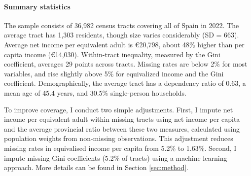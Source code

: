 \paragraph{Summary statistics} The sample consists of 36,982 census tracts covering all of Spain in 2022. The average tract has 1,303 residents, though size varies considerably (SD = 663). Average net income per equivalent adult is €20,798, about 48\% higher than per capita income (€14,030). Within-tract inequality, measured by the Gini coefficient, averages 29 points across tracts. Missing rates are below 2\% for most variables, and rise slightly above 5\% for equivalized income and the Gini coefficient. Demographically, the average tract has a dependency ratio of 0.63, a mean age of 45.4 years, and 30.5\% single-person households.

\begin{table}[H]
\centering
{}
\end{table}

To improve coverage, I conduct two simple adjustments. First, I impute net income per equivalent adult within missing tracts using net income per capita and the average provincial ratio between these two measures, calculated using population weights from non-missing observations. This adjustment reduces missing rates in equivalised income per capita from 5.2\% to 1.63\%. Second, I impute missing Gini coefficients (5.2\% of tracts) using a machine learning approach. More details can be found in Section \ref{sec:method}.